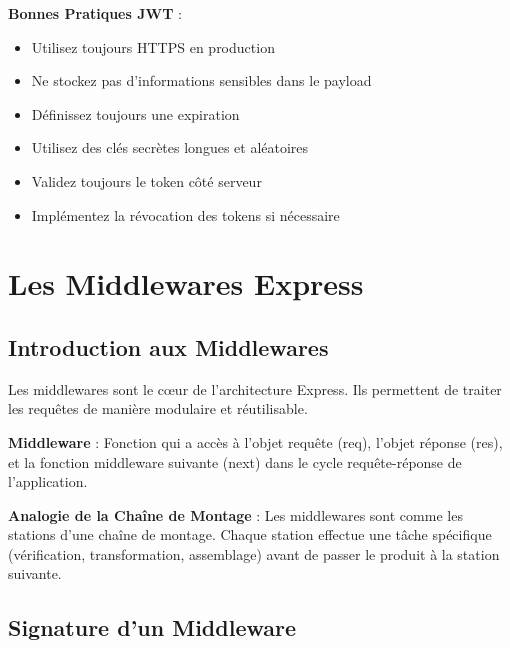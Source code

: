 \begin{bestpracticebox}
    \textbf{Bonnes Pratiques JWT} :
    \begin{itemize}
        \item Utilisez toujours HTTPS en production
        \item Ne stockez pas d'informations sensibles dans le payload
        \item Définissez toujours une expiration
        \item Utilisez des clés secrètes longues et aléatoires
        \item Validez toujours le token côté serveur
        \item Implémentez la révocation des tokens si nécessaire
    \end{itemize}
\end{bestpracticebox}

\chapter{Les Middlewares Express}

\section{Introduction aux Middlewares}

Les middlewares sont le cœur de l'architecture Express. Ils permettent de traiter les requêtes de manière modulaire et réutilisable.

\begin{definitionbox}
    \textbf{Middleware} : Fonction qui a accès à l'objet requête (req), l'objet réponse (res), et la fonction middleware suivante (next) dans le cycle requête-réponse de l'application.
\end{definitionbox}

\begin{analogybox}
    \textbf{Analogie de la Chaîne de Montage} :
    Les middlewares sont comme les stations d'une chaîne de montage. Chaque station effectue une tâche spécifique (vérification, transformation, assemblage) avant de passer le produit à la station suivante.
\end{analogybox}

\section{Signature d'un Middleware}

